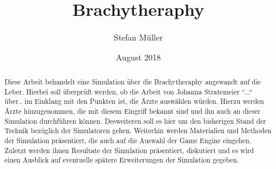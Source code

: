 \documentclass{scrartcl}
\title{Brachytheraphy}
\author{Stefan Müller}
\date{August 2018}
\begin{document}
\begin{titlepage}
\maketitle
\end{titlepage}

	\begin{abstract}
	Diese Arbeit behandelt eine Simulation über die Brachytheraphy angewandt auf die Leber. Hierbei soll überprüft werden, ob die Arbeit von Johanna Stratemeier ``...`` über.. im Einklang mit den Punkten ist, die Ärzte auswählen würden. Hierzu werden Ärzte hinzugenommen, die mit diesem Eingriff bekannt sind und ihn auch an dieser 			Simulation durchführen können. Desweiteren soll es hier um den bisherigen Stand der Technik bezüglich der Simulatoren gehen. Weiterhin werden Materialien und Methoden der Simulation präsentiert, die auch auf die Auswahl der Game Engine eingehen. Zuletzt werden ihnen Resultate der Simulation präsentiert, diskutiert und es wird einen 			Ausblick auf eventuelle spätere Erweiterungen der Simulation gegeben.
	\end{abstract}
	
	\begin{page}
	
	\end{page}
\end{document}
